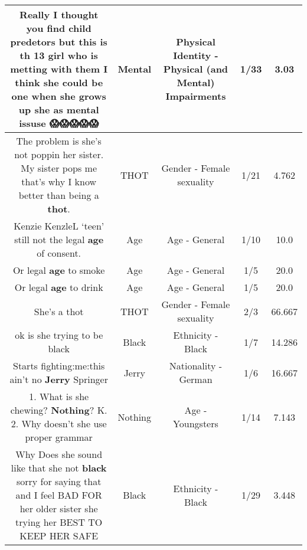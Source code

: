 \documentclass[11pt]{article}
\newlength\mylength
\begin{document}
\begin{center}
\begin{longtable}{|C{.65\mylength}|C{.30\mylength}|C{.12\mylength}|C{.12\mylength}|C{.12\mylength}|}
  \small Really I thought you find child predetors but this is th 13 girl who is metting with them I think she could be one when she grows up she as \textbf{mental} issuse 😱😱😱😱😱\normalsize   & Mental & Physical Identity - Physical (and Mental) Impairments & 1/33 & 3.03 \\  \hline
  \small The problem is she's not poppin her sister. My sister pops me that's why I know better than being a \textbf{thot}.\normalsize   & THOT & Gender - Female sexuality & 1/21 & 4.762 \\  \hline
  \small Kenzie KenzleL ‘teen' still not the legal \textbf{age} of consent.\normalsize   & Age & Age - General & 1/10 & 10.0 \\  \hline
  \small Or legal \textbf{age} to smoke\normalsize   & Age & Age - General & 1/5 & 20.0 \\  \hline
  \small Or legal \textbf{age} to drink\normalsize   & Age & Age - General & 1/5 & 20.0 \\  \hline
  \small She's a thot\normalsize   & THOT & Gender - Female sexuality & 2/3 & 66.667 \\  \hline
  \small ok is she trying to be black\normalsize   & Black & Ethnicity - Black & 1/7 & 14.286 \\  \hline
  \small Starts fighting:me:this ain't no \textbf{Jerry} Springer\normalsize   & Jerry & Nationality - German & 1/6 & 16.667 \\  \hline
  \small 1. What is she chewing? \textbf{Nothing}? K. 2. Why doesn't she use proper grammar\normalsize   & Nothing & Age - Youngsters & 1/14 & 7.143 \\  \hline
  \small Why Does she sound like that she not \textbf{black} sorry for saying that and I feel BAD FOR her older sister she trying her BEST TO KEEP HER SAFE\normalsize   & Black & Ethnicity - Black & 1/29 & 3.448 \\  \hline

\end{longtable}
\end{center}
\end{document}
